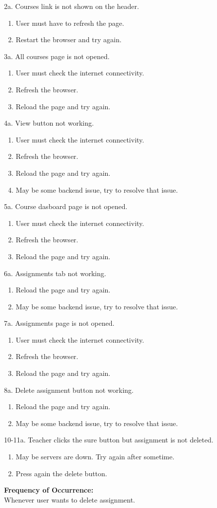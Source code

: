 2a. Courses link is not shown on the header.
\begin{enumerate}
\item User must have to refresh the page.
\item Restart the browser and try again.
\end{enumerate} 
3a. All courses page is not opened.
\begin{enumerate}
\item User must check the internet connectivity.
\item Refresh the browser.
\item Reload the page and try again.
\end{enumerate}
4a. View button not working.
\begin{enumerate}
\item User must check the internet connectivity.
\item Refresh the browser.
\item Reload the page and try again.
\item May be some backend issue, try to resolve that issue.
\end{enumerate}
5a. Course dasboard page is not opened.
\begin{enumerate}
\item User must check the internet connectivity.
\item Refresh the browser.
\item Reload the page and try again.
\end{enumerate}
6a. Assignments tab not working.
\begin{enumerate}
\item Reload the page and try again.
\item May be some backend issue, try to resolve that issue.
\end{enumerate}
7a. Assignments page is not opened.
\begin{enumerate}
\item User must check the internet connectivity.
\item Refresh the browser.
\item Reload the page and try again.
\end{enumerate}
8a. Delete assignment button not working.
\begin{enumerate}
\item Reload the page and try again.
\item May be some backend issue, try to resolve that issue.
\end{enumerate}
10-11a. Teacher clicks the sure button but assignment is not deleted.
\begin{enumerate}
\item May be servers are down. Try again after sometime.
\item Press again the delete button.
\end{enumerate}
\textbf{Frequency of Occurrence:}\\
Whenever user wants to delete assignment.



